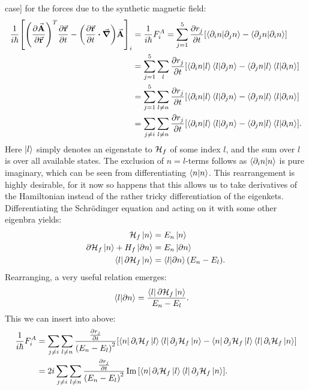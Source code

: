 \documentclass[a4paper]{article}
\begin{document}
case] for the forces due to the synthetic magnetic field:
\begin{align*}
             \frac{1}{i\hbar{}}\bqty{\pqty{\frac{\partial \va{A}}{\partial \va{r}}}^T \frac{\partial
\va{r}}{\partial t} - \pqty{\frac{\partial \va{r}}{\partial t}  \vdot \grad}\va{A}}_i
 &= \frac{1}{i\hbar{}}F_{i}^A = \sum_{j=1}^{5} \frac{\partial
        r_j}{\partial t} \bqty{\bra{\partial_i n}\ket{\partial_j n}-\bra{\partial_j n}\ket{\partial_i
        n}}\\
        &= \sum_{j=1}^{5} \sum_{l} \frac{\partial r_j}{\partial t}\bqty{\bra{\partial_i
                n}\ket{l}\bra{l}\ket{\partial_j n}- \bra{\partial_j
        n}\ket{l}\bra{l}\ket{\partial_i n}}\\
        &= \sum_{j=1}^{5} \sum_{l \ne n} \frac{\partial r_j}{\partial t}\bqty{\bra{\partial_i
                n}\ket{l}\bra{l}\ket{\partial_j n}- \bra{\partial_j
        n}\ket{l}\bra{l}\ket{\partial_i n}}\\
        &= \sum_{j\ne i} \sum_{l \ne n} \frac{\partial r_j}{\partial t}\bqty{\bra{\partial_i
                n}\ket{l}\bra{l}\ket{\partial_j n}- \bra{\partial_j
        n}\ket{l}\bra{l}\ket{\partial_i n}}
.\end{align*}
Here \(\ket{l}\) simply denotes an eigenstate to \(\mathbb{\cal H}_{f}\) of some index
\(l\), and the sum over \(l\) is over all available states. The exclusion of \(n=l\)-terms follows as
\(\bra{\partial_i n}\ket{n}\) is pure imaginary, which can be seen from differentiating
\(\bra{n}\ket{n}\). This rearrangement is highly desirable, for it now so happens that this
allows us to take derivatives of the Hamiltonian instead of the rather tricky
differentiation of the eigenkets. Differentiating the Schrödinger equation and acting on it
with some other eigenbra yields:
\begin{align*}
        \mathbb{\cal H}_f \ket{n} &= E_n \ket{n}\\
        \partial \mathbb{\cal H}_f \ket{n} + H_f \ket{\partial n} &= E_n \ket{\partial n}\\
        \bra{l}\partial \mathbb{\cal H}_f \ket{n} &= \bra{l}\ket{\partial n}(E_n - E_l)
.\end{align*}
Rearranging, a very useful relation emerges:
\begin{align}\label{eq:Hdiff}
        \bra{l}\ket{\partial n} &= \frac{\bra{l}\partial \mathbb{\cal H}_f \ket{n}}{E_n
        - E_l}
.\end{align}
This we can insert into above:
\begin{align}\label{eq:FA}
\frac{1}{i\hbar{}}F_i^A &= \sum_{j\ne i} \sum_{l \ne n} \frac{\frac{\partial r_j}{\partial
        t}}{\pqty{E_n-E_l}^2}\bqty{\bra{n}\partial_i \mathbb{\cal H}_f
        \ket{l}\bra{l}\partial_j\mathbb{\cal H}_f\ket{n} - \bra{n}\partial_j \mathbb{\cal
        H}_f\ket{l}\bra{l}\partial_i \mathbb{\cal H}_f\ket{n}}\\
        &= 2i\sum_{j\ne i} \sum_{l \ne n} \frac{\frac{\partial r_j}{\partial
        t}}{\pqty{E_n-E_l}^2} \Im \bqty{\bra{n}\partial_i \mathbb{\cal H}_f
        \ket{l}\bra{l}\partial_j\mathbb{\cal H}_f\ket{n}}
.\end{align}
\end{document}
